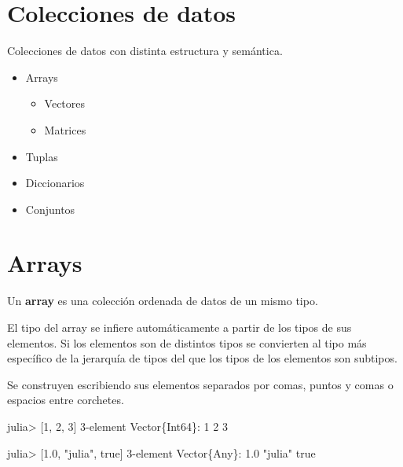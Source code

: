 \documentclass[
  letterpaper,
  DIV=11,
  numbers=noendperiod]{scrreprt}
\newenvironment{Shaded}{\begin{snugshade}}{\end{snugshade}}
\newcommand{\ConstantTok}[1]{\textcolor[rgb]{0.56,0.35,0.01}{#1}}
\newcommand{\DataTypeTok}[1]{\textcolor[rgb]{0.68,0.00,0.00}{#1}}
\newcommand{\FloatTok}[1]{\textcolor[rgb]{0.68,0.00,0.00}{#1}}
\newcommand{\NormalTok}[1]{\textcolor[rgb]{0.00,0.23,0.31}{#1}}
\newcommand{\OperatorTok}[1]{\textcolor[rgb]{0.37,0.37,0.37}{#1}}
\newcommand{\StringTok}[1]{\textcolor[rgb]{0.13,0.47,0.30}{#1}}
\providecommand{\tightlist}{%
  \setlength{\itemsep}{0pt}\setlength{\parskip}{0pt}}\usepackage{longtable,booktabs,array}
\begin{document}
\hypertarget{colecciones-de-datos}{%
\section{Colecciones de datos}\label{colecciones-de-datos}}

Colecciones de datos con distinta estructura y semántica.

\begin{itemize}
\tightlist
\item
  Arrays

  \begin{itemize}
  \tightlist
  \item
    Vectores
  \item
    Matrices
  \end{itemize}
\item
  Tuplas
\item
  Diccionarios
\item
  Conjuntos
\end{itemize}

\hypertarget{arrays}{%
\section{Arrays}\label{arrays}}

Un \textbf{array} es una colección ordenada de datos de un mismo tipo.

El tipo del array se infiere automáticamente a partir de los tipos de
sus elementos. Si los elementos son de distintos tipos se convierten al
tipo más específico de la jerarquía de tipos del que los tipos de los
elementos son subtipos.

Se construyen escribiendo sus elementos separados por comas, puntos y
comas o espacios entre corchetes.

\begin{Shaded}
\begin{Highlighting}[]
\NormalTok{julia}\OperatorTok{\textgreater{}}\NormalTok{ [}\FloatTok{1}\NormalTok{, }\FloatTok{2}\NormalTok{, }\FloatTok{3}\NormalTok{]}
\FloatTok{3}\OperatorTok{{-}}\NormalTok{element }\DataTypeTok{Vector}\NormalTok{\{}\DataTypeTok{Int64}\NormalTok{\}}\OperatorTok{:}
 \FloatTok{1}
 \FloatTok{2}
 \FloatTok{3}

\NormalTok{julia}\OperatorTok{\textgreater{}}\NormalTok{ [}\FloatTok{1.0}\NormalTok{, }\StringTok{"julia"}\NormalTok{, }\ConstantTok{true}\NormalTok{]}
\FloatTok{3}\OperatorTok{{-}}\NormalTok{element }\DataTypeTok{Vector}\NormalTok{\{}\DataTypeTok{Any}\NormalTok{\}}\OperatorTok{:}
    \FloatTok{1.0}
     \StringTok{"julia"}
 \ConstantTok{true}
\end{Highlighting}
\end{Shaded}
\end{document}
